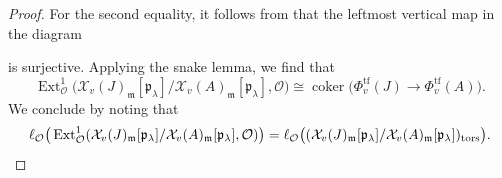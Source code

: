 \documentclass[a4paper, notitlepage, 10pt]{amsart}
\theoremstyle{plain} %
\theoremstyle{definition} %
\theoremstyle{remark} %
\numberwithin{equation}{section}
\newcommand{\bbT}{\mathbb T}
\newcommand{\Ext}{\operatorname{Ext}} %
\newcommand{\coker}{\operatorname{coker}} %
\newcommand{\tf}{\operatorname{tf}} %
\newcommand{\tors}{\operatorname{tors}} %
\begin{document}
\begin{proof}
For the second equality, it follows from \cite[Lemma 3.1 (iii)]{Em03} that the leftmost vertical map in the diagram 
\begin{center}
\end{center}
is surjective. Applying the snake lemma, we find that  
$$\Ext^1_\mathcal{O}\big(\mathcal{X}_v(J)_{\mathfrak{m}}[\mathfrak{p}_\lambda]/\mathcal{X}_v(A)_{\mathfrak{m}}[\mathfrak{p}_\lambda],\mathcal{O}\big)\cong \coker\big(\Phi^{\tf}_v(J)\to \Phi^{\tf}_v(A)\big).$$
We conclude by noting that 
\begin{equation*}
    \ell_{\mathcal{O}}\big(\Ext^1_\mathcal{O}(\mathcal{X}_v(J)_{\mathfrak{m}}[\mathfrak{p}_\lambda]/\mathcal{X}_v(A)_{\mathfrak{m}}[\mathfrak{p}_\lambda],\mathcal{O})\big)=\ell_{\mathcal{O}}\big((\mathcal{X}_v(J)_{\mathfrak{m}}[\mathfrak{p}_\lambda]/\mathcal{X}_v(A)_{\mathfrak{m}}[\mathfrak{p}_\lambda])_{\tors}\big). \qedhere
\end{equation*}
\end{proof}
\end{document}

